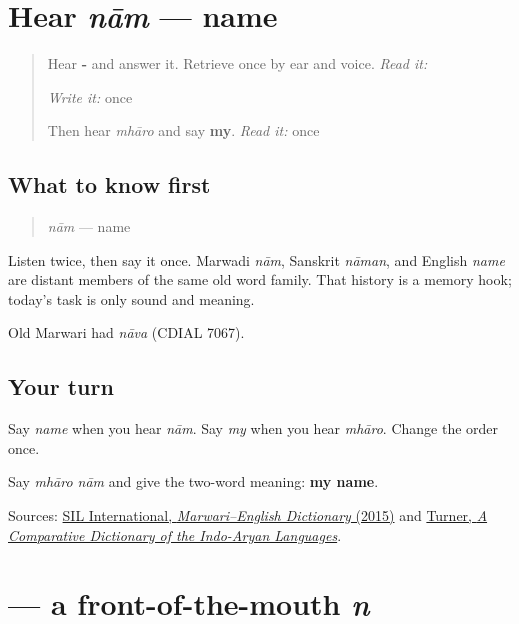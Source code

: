 \section[nām]{Hear \emph{nām} — name}

\label{lesson:MW-C05-hear-naam}



\begin{quote}
Hear \textbf{- } and answer it. Retrieve \textbf{} once by ear and voice. \emph{Read it:} \textbf{}

\emph{Write it:} \textbf{} once

Then hear \emph{mhāro} and say \textbf{my}. \emph{Read it:} \textbf{} once
\end{quote}

\subsection*{What to know first}
\begin{quote}
\emph{nām} — name
\end{quote}

Listen twice, then say it once. Marwadi \emph{nām}, Sanskrit \emph{nāman}, and English \emph{name} are distant members of the same old word family. That history is a memory hook; today's task is only sound and meaning.

Old Marwari had \emph{nāva} (CDIAL 7067).

\subsection*{Your turn}
Say \emph{name} when you hear \emph{nām}. Say \emph{my} when you hear \emph{mhāro}. Change the order once.

\begin{tcolorbox}[breakable,colback=teal!4,colframe=teal!35!black,title={Before you move on}]
Say \emph{mhāro nām} and give the two-word meaning: \textbf{my name}.

Sources: \href{https://nepal.sil.org/resources/archives/63768}{SIL International, \emph{Marwari–English Dictionary} (2015)} and \href{https://dsal.uchicago.edu/dictionaries/soas/}{Turner, \emph{A Comparative Dictionary of the Indo-Aryan Languages}}.
\end{tcolorbox}
\section[\texorpdfstring{\mw{न} (na)}{न (na)}]{ — a front-of-the-mouth \emph{n}}

